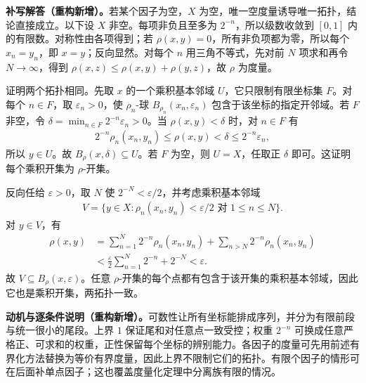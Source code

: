 \documentclass[../../main.tex]{subfiles}
\begin{document}
\begin{solution}
\textbf{补写解答（重构新增）。}若某个因子为空，$X$ 为空，唯一空度量诱导唯一拓扑，结论直接成立。以下设 $X$ 非空。每项非负且至多为 $2^{-n}$，所以级数收敛到 $[0,1]$ 内的有限数。对称性由各项得到；若 $\rho(x,y)=0$，所有非负项都为零，所以每个 $x_n=y_n$，即 $x=y$；反向显然。对每个 $n$ 用三角不等式，先对前 $N$ 项求和再令 $N\to\infty$，得到 $\rho(x,z)\le\rho(x,y)+\rho(y,z)$，故 $\rho$ 为度量。

证明两个拓扑相同。先取 $x$ 的一个乘积基本邻域 $U$，它只限制有限坐标集 $F$。对每个 $n\in F$，取 $\varepsilon_n>0$，使 $\rho_n$-球 $B_{\rho_n}(x_n,\varepsilon_n)$ 包含于该坐标的指定开邻域。若 $F$ 非空，令 $\delta=\min_{n\in F}2^{-n}\varepsilon_n>0$。当 $\rho(x,y)<\delta$ 时，对 $n\in F$ 有
\begin{align*}
2^{-n}\rho_n(x_n,y_n)\le\rho(x,y)<\delta
\le2^{-n}\varepsilon_n,
\end{align*}
所以 $y\in U$。故 $B_\rho(x,\delta)\subseteq U$。若 $F$ 为空，则 $U=X$，任取正 $\delta$ 即可。这证明每个乘积开集为 $\rho$-开集。

反向任给 $\varepsilon>0$，取 $N$ 使 $2^{-N}<\varepsilon/2$，并考虑乘积基本邻域
\begin{align*}
V=\{y\in X:\rho_n(x_n,y_n)<\varepsilon/2
\text{ 对 }1\le n\le N\}.
\end{align*}
对 $y\in V$，有
\begin{align*}
\rho(x,y)
&=\sum_{n=1}^N2^{-n}\rho_n(x_n,y_n)
+\sum_{n>N}2^{-n}\rho_n(x_n,y_n)\\
&<\frac\varepsilon2\sum_{n=1}^N2^{-n}+2^{-N}<\varepsilon.
\end{align*}
故 $V\subseteq B_\rho(x,\varepsilon)$。任意 $\rho$-开集的每个点都有包含于该开集的乘积基本邻域，因此它也是乘积开集，两拓扑一致。
\end{solution}
\begin{remark}
\textbf{动机与逐条件说明（重构新增）。}可数性让所有坐标能排成序列，并分为有限前段与统一很小的尾段。上界 $1$ 保证尾和对任意点一致受控；权重 $2^{-n}$ 可换成任意严格正、可求和的权重，正性保留每个坐标的辨别能力。各因子的度量可先用前述有界化方法替换为等价有界度量，因此上界不限制它们的拓扑。有限个因子的情形可在后面补单点因子；这也覆盖度量化定理中分离族有限的情况。
\end{remark}
\end{document}

